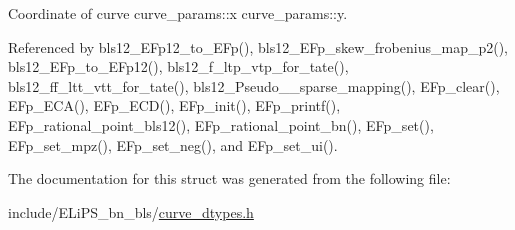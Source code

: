 Coordinate of curve curve\+\_\+params\+::x curve\+\_\+params\+::y. 

Referenced by bls12\+\_\+\+E\+Fp12\+\_\+to\+\_\+\+E\+Fp(), bls12\+\_\+\+E\+Fp\+\_\+skew\+\_\+frobenius\+\_\+map\+\_\+p2(), bls12\+\_\+\+E\+Fp\+\_\+to\+\_\+\+E\+Fp12(), bls12\+\_\+f\+\_\+ltp\+\_\+vtp\+\_\+for\+\_\+tate(), bls12\+\_\+ff\+\_\+ltt\+\_\+vtt\+\_\+for\+\_\+tate(), bls12\+\_\+\+Pseudo\+\_\+\_\+sparse\+\_\+mapping(), E\+Fp\+\_\+clear(), E\+Fp\+\_\+\+E\+C\+A(), E\+Fp\+\_\+\+E\+C\+D(), E\+Fp\+\_\+init(), E\+Fp\+\_\+printf(), E\+Fp\+\_\+rational\+\_\+point\+\_\+bls12(), E\+Fp\+\_\+rational\+\_\+point\+\_\+bn(), E\+Fp\+\_\+set(), E\+Fp\+\_\+set\+\_\+mpz(), E\+Fp\+\_\+set\+\_\+neg(), and E\+Fp\+\_\+set\+\_\+ui().



The documentation for this struct was generated from the following file\+:\begin{DoxyCompactItemize}
\item 
include/\+E\+Li\+P\+S\+\_\+bn\+\_\+bls/\hyperlink{curve__dtypes_8h}{curve\+\_\+dtypes.\+h}\end{DoxyCompactItemize}
